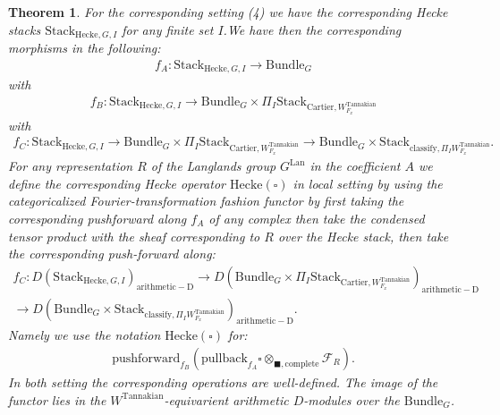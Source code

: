 \documentclass[12pt]{book}
\newtheorem{theorem}{Theorem}
\theoremstyle{definition}
\begin{document}
\begin{theorem}
For the corresponding setting (4) we have the corresponding Hecke stacks $\mathrm{Stack}_{\mathrm{Hecke},G,I}$ for any finite set $I$.We have then the corresponding morphisms in the following:
\begin{align}
f_A: \mathrm{Stack}_{\mathrm{Hecke},G,I} \rightarrow \mathrm{Bundle}_{G}
\end{align}
with
\begin{align}
f_B: \mathrm{Stack}_{\mathrm{Hecke},G,I} \rightarrow \mathrm{Bundle}_{G}\times \Pi_I \mathrm{Stack}_{\mathrm{Cartier},W^\mathrm{Tannakian}_{F_x}}
\end{align}
with
\begin{align}
f_C: \mathrm{Stack}_{\mathrm{Hecke},G,I} \rightarrow \mathrm{Bundle}_{G}\times \Pi_I \mathrm{Stack}_{\mathrm{Cartier},W^\mathrm{Tannakian}_{F_x}}\rightarrow \mathrm{Bundle}_{G}\times \mathrm{Stack}_{\mathrm{classify},\Pi_I W^\mathrm{Tannakian}_{F_x}}.
\end{align}
For any representation $R$ of the Langlands group $G^\mathrm{Lan}$ in the coefficient $A$ we define the corresponding Hecke operator $\mathrm{Hecke}(\square)$ in local setting by using the categoricalized Fourier-transformation fashion functor by first taking the corresponding pushforward along $f_A$ of any complex then take the condensed tensor product with the sheaf corresponding to $R$ over the Hecke stack, then take the corresponding push-forward along:
\begin{align}
f_C: D(\mathrm{Stack}_{\mathrm{Hecke},G,I})_{\mathrm{arithmetic-D}} \rightarrow D(\mathrm{Bundle}_{G}\times \Pi_I\mathrm{Stack}_{\mathrm{Cartier},W^\mathrm{Tannakian}_{F_x}})_{\mathrm{arithmetic-D}} \\
 \rightarrow D(\mathrm{Bundle}_{G}\times \mathrm{Stack}_{\mathrm{classify},\Pi_I W^\mathrm{Tannakian}_{F_x}})_{\mathrm{arithmetic-D}}.
\end{align}
Namely we use the notation $\mathrm{Hecke}(\square)$ for:
\begin{align}
\mathrm{pushforward}_{f_B}(\mathrm{pullback}_{f_A}\square\otimes_{\blacksquare,\mathrm{complete}}\mathcal{F}_R).
\end{align}
In both setting the corresponding operations are well-defined. The image of the functor lies in the $W^\mathrm{Tannakian}$-equivarient arithmetic $D$-modules over the $\mathrm{Bundle}_G$.
\end{theorem}
\end{document}
